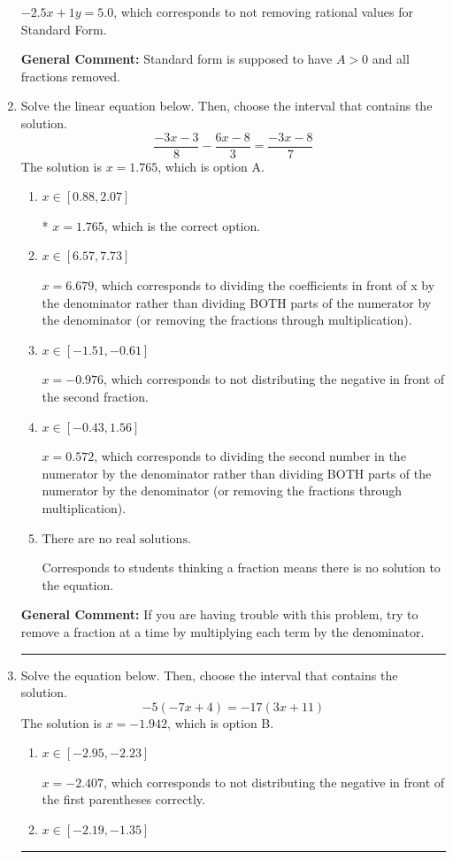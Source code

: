 \documentclass{extbook}[14pt]
\newcommand{\litem}[1]{\item #1

\rule{\textwidth}{0.4pt}}
\begin{document}
\begin{enumerate}
{\begin{enumerate}[label=\Alph*.]
 $-2.5x + 1y = 5.0$, which corresponds to not removing rational values for Standard Form.
\end{enumerate}

\textbf{General Comment:} Standard form is supposed to have $A > 0$ and all fractions removed.
}
\litem{
Solve the linear equation below. Then, choose the interval that contains the solution.
\[ \frac{-3x -3}{8} - \frac{6x -8}{3} = \frac{-3x -8}{7} \]The solution is \( x = 1.765 \), which is option A.\begin{enumerate}[label=\Alph*.]
\item \( x \in [0.88, 2.07] \)

* $x = 1.765$, which is the correct option.
\item \( x \in [6.57, 7.73] \)

 $x = 6.679$, which corresponds to dividing the coefficients in front of x by the denominator rather than dividing BOTH parts of the numerator by the denominator (or removing the fractions through multiplication).
\item \( x \in [-1.51, -0.61] \)

 $x = -0.976$, which corresponds to not distributing the negative in front of the second fraction.
\item \( x \in [-0.43, 1.56] \)

 $x = 0.572$, which corresponds to dividing the second number in the numerator by the denominator rather than dividing BOTH parts of the numerator by the denominator (or removing the fractions through multiplication).
\item \( \text{There are no real solutions.} \)

Corresponds to students thinking a fraction means there is no solution to the equation.
\end{enumerate}

\textbf{General Comment:} If you are having trouble with this problem, try to remove a fraction at a time by multiplying each term by the denominator.
}
\litem{
Solve the equation below. Then, choose the interval that contains the solution.
\[ -5(-7x + 4) = -17(3x + 11) \]The solution is \( x = -1.942 \), which is option B.\begin{enumerate}[label=\Alph*.]
\item \( x \in [-2.95, -2.23] \)

$x = -2.407$, which corresponds to not distributing the negative in front of the first parentheses correctly.
\item \( x \in [-2.19, -1.35] \)


\end{enumerate}}
\end{enumerate}
\end{document}
